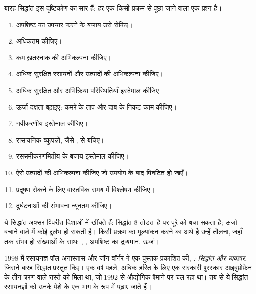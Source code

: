 बारह सिद्धांत इस दृष्टिकोण का सार हैं; हर एक किसी प्रक्रम से पूछा जाने वाला
एक प्रश्न है।
\begin{enumerate}
  \item अपशिष्ट का उपचार करने के बजाय उसे रोकिए।
  \item {} अधिकतम कीजिए।
  \item कम ख़तरनाक  की अभिकल्पना कीजिए।
  \item अधिक सुरक्षित रसायनों और उत्पादों की अभिकल्पना कीजिए।
  \item अधिक सुरक्षित  और अभिक्रिया परिस्थितियाँ इस्तेमाल कीजिए।
  \item ऊर्जा दक्षता बढ़ाइए: कमरे के ताप और दाब के निकट
        काम कीजिए।
  \item नवीकरणीय  इस्तेमाल कीजिए।
  \item रासायनिक व्युत्पन्नों, जैसे , से बचिए।
  \item रससमीकरणमितीय  के बजाय  इस्तेमाल कीजिए।
  \item ऐसे उत्पादों की अभिकल्पना कीजिए जो उपयोग के बाद विघटित हो जाएँ।
  \item प्रदूषण रोकने के लिए वास्तविक समय में विश्लेषण कीजिए।
  \item दुर्घटनाओं की संभावना न्यूनतम कीजिए।
\end{enumerate}

\begin{remark}[सिद्धांत, नियम नहीं]\label{rem:g12:synthesis-strategy:principles}
ये सिद्धांत अक्सर विपरीत दिशाओं में खींचते हैं: 
सिद्धांत 8 तोड़ता है पर पूरे  को बचा सकता है; ऊर्जा बचाने वाले  में
कोई दुर्लभ  हो सकती है। किसी प्रक्रम का मूल्यांकन करने का अर्थ है उन्हें तौलना,
जहाँ तक संभव हो संख्याओं के साथ: , , अपशिष्ट का द्रव्यमान,
ऊर्जा।
\end{remark}

\begin{history}[हरित रसायन, 1998]
1998 में रसायनज्ञ पॉल अनास्तास और जॉन वॉर्नर ने एक पुस्तक प्रकाशित की,
\emph{: सिद्धांत और व्यवहार}, जिसने बारह
सिद्धांत प्रस्तुत किए। एक वर्ष पहले, अधिक हरित  के लिए एक सरकारी पुरस्कार
आइबुप्रोफ़ेन के तीन-चरण वाले रास्ते को मिला था, जो 1992 से औद्योगिक पैमाने पर
चल रहा था। तब से ये सिद्धांत रसायनज्ञों को उनके पेशे के
एक भाग के रूप में पढ़ाए जाते हैं।
\end{history}

